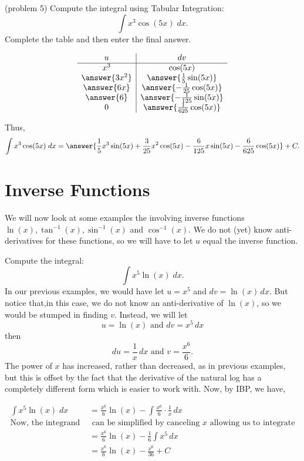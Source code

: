 \documentclass[handout]{ximera}
\begin{document}
\begin{problem}(problem 5)
Compute the integral using Tabular Integration:
  \[
  \int x^3 \cos(5x) \;dx.
  \]
Complete the table and then enter the final answer.
\begin{center}
\[
\begin{array}{c|c}
		u & dv  \\\hline 
		x^3 & \cos(5x) \\ 
     \answer{3x^2} & \answer{\frac15 \sin(5x)} \\ 
      \answer{6x} & \answer{-\frac{1}{25} \cos(5x)} \\ 
       \answer{6} & \answer{-\frac{1}{125} \sin(5x)} \\
       0 & \answer{\frac{1}{625} \cos(5x)} 
	\end{array}
    \]
\end{center}



Thus,
\[
  \int x^3 \cos(5x) \;dx = \answer{\frac15 x^3\sin(5x) + \frac{3}{25}x^2 \cos(5x) - \frac{6}{125}x\sin(5x) -\frac{6}{625}\cos(5x)} +C.
  \]
\end{problem}



\section{Inverse Functions}

We will now look at some examples the involving inverse functions $\ln(x), \tan^{-1}(x), \sin^{-1}(x)$ and $\cos^{-1}(x)$.
We do not (yet) know anti-derivatives for these functions, so we will have to let $u$ equal the inverse function.
 
\begin{example}[example 6]
Compute the integral:
  \[
  \int x^5\ln(x) \;dx.
  \]
In our previous examples, we would have let $u = x^5$ and $dv = \ln(x) \, dx$.
But notice that,in this case, we do not know an anti-derivative of $\ln(x)$, so 
we would be stumped in finding $v$. Instead, we will let 
\[
u = \ln(x)  \text{   and   } dv = x^5 \, dx\]
then
\[
du = \frac{1}{x} \, dx \text{   and   } v = \frac{x^6}{6}.
\]
The power of $x$ has increased, rather than decreased, as in previous examples, but this 
is offset by the fact that the derivative of the natural log has a completely different form
which is easier to work with. Now, by IBP, we have,

\begin{align*}
  \int x^5\ln(x) \;dx &= \frac{x^6}{6}\ln(x) - \int \frac{x^6}{6}\cdot \frac{1}{x} \, dx\\
\text{Now, the integrand } & \text{ can be simplified by canceling $x$ allowing us to integrate}\\
&= \frac{x^6}{6}\ln(x) - \frac16\int x^5 \, dx\\
&= \frac{x^6}{6}\ln(x) -  \frac{x^6}{36} + C\\
\end{align*}

\end{example}
\end{document}
